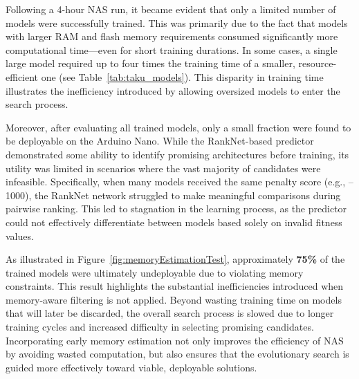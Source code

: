 Following a 4-hour NAS run, it became evident that only a limited number of models were successfully trained. This was primarily due to the fact that models with larger RAM and flash memory requirements consumed significantly more computational time—even for short training durations. In some cases, a single large model required up to four times the training time of a smaller, resource-efficient one (see Table~\ref{tab:taku_models}). This disparity in training time illustrates the inefficiency introduced by allowing oversized models to enter the search process.

Moreover, after evaluating all trained models, only a small fraction were found to be deployable on the Arduino Nano. While the RankNet-based predictor demonstrated some ability to identify promising architectures before training, its utility was limited in scenarios where the vast majority of candidates were infeasible. Specifically, when many models received the same penalty score (e.g., –1000), the RankNet network struggled to make meaningful comparisons during pairwise ranking. This led to stagnation in the learning process, as the predictor could not effectively differentiate between models based solely on invalid fitness values.

As illustrated in Figure~\ref{fig:memoryEstimationTest}, approximately \textbf{75\%} of the trained models were ultimately undeployable due to violating memory constraints. This result highlights the substantial inefficiencies introduced when memory-aware filtering is not applied. Beyond wasting training time on models that will later be discarded, the overall search process is slowed due to longer training cycles and increased difficulty in selecting promising candidates. Incorporating early memory estimation not only improves the efficiency of NAS by avoiding wasted computation, but also ensures that the evolutionary search is guided more effectively toward viable, deployable solutions.

\clearpage

\begin{table}[ht]
\noindent %
\hspace*{-\oddsidemargin} %
\caption{Summary of two TakuNet models.}
\label{tab:taku_models}
\end{table}

